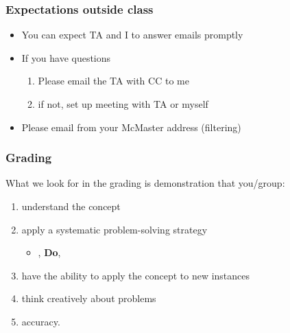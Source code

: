 \begin{frame}\frametitle{Expectations outside class}
	\begin{itemize}
		\item	You can expect TA and I to answer emails promptly
		\item	If you have questions
			\begin{enumerate}
				\item	Please email the TA with CC to me \hfill {\tiny{\color{myOrange}{$\longleftarrow$ hopefully this solves your problem}}}
				\item	if not, set up meeting with TA or myself
			\end{enumerate}
		\item	Please email from your McMaster address (filtering)
	\end{itemize}
\end{frame}

\begin{frame}\frametitle{Grading}
	What we look for in the grading is demonstration that you/group:
	\begin{enumerate}
		\item	understand the concept
		\item	apply a systematic problem-solving strategy
		\begin{itemize}
			
			\item	\texttt{{\color{purple}{Define, Explore, Plan}}}, \textbf{Do}, \texttt{{\color{myOrange}{Check, Generalize}}}
		\end{itemize}
		\item	have the ability to apply the concept to new instances
		\item	think creatively about problems
		\item	accuracy.
	\end{enumerate}
\end{frame}

